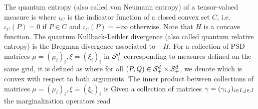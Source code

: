 The quantum entropy (also called von Neumann entropy) of a tensor-valued measure is 
where $\iota_C$ is the indicator function of a closed convex set $C$, i.e. $\iota_C(P)=0$ if $P \in C$ and $\iota_C(P)=+\infty$ otherwise.
Note that $H$ is a concave function. 
%
The quantum Kullback-Leibler divergence (also called quantum relative entropy) is the Bregman divergence associated to $-H$. For a collection of PSD matrices $\mu=(\mu_i)_i, \xi=(\xi_i)_i$ in $\mathcal{S}_+^d$ corresponding to measures defined on the same grid, it is defined as %
where for all $(P,Q) \in \mathcal{S}_{+}^d \times \mathcal{S}_{+}^d$, we denote
which is convex with respect to both arguments. 
%
The inner product between collections of matrices $\mu=(\mu_i)_i, \xi=(\xi_i)_i$ is 
Given a collection of matrices $\gamma=(\gamma_{i,j})_{i \in I,j \in J}$ the marginalization operators read
